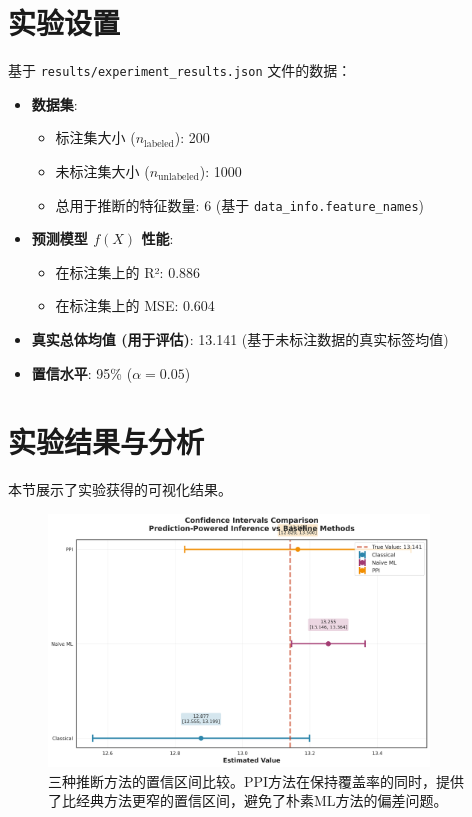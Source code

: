 \documentclass[12pt,a4paper]{article}
\begin{document}
\section{实验设置}
\indent 基于 \texttt{results/experiment\_results.json} 文件的数据：
\begin{itemize}
    \item \textbf{数据集}:
    \begin{itemize}
        \item 标注集大小 ($n_{\text{labeled}}$): 200
        \item 未标注集大小 ($n_{\text{unlabeled}}$): 1000
        \item 总用于推断的特征数量: 6 (基于 \texttt{data\_info.feature\_names})
    \end{itemize}
    \item \textbf{预测模型 $f(X)$ 性能}:
    \begin{itemize}
        \item 在标注集上的 R²: 0.886
        \item 在标注集上的 MSE: 0.604
    \end{itemize}
    \item \textbf{真实总体均值 (用于评估)}: 13.141 (基于未标注数据的真实标签均值)
    \item \textbf{置信水平}: 95\% ($\alpha = 0.05$)
\end{itemize}

\section{实验结果与分析}
\label{sec:results_analysis}

本节展示了实验获得的可视化结果。

\begin{figure}[H]
    \centering
    \includegraphics[width=0.9\textwidth]{confidence_intervals_comparison.png}
    \caption{三种推断方法的置信区间比较。PPI方法在保持覆盖率的同时，提供了比经典方法更窄的置信区间，避免了朴素ML方法的偏差问题。}
    \label{fig:confidence_intervals_comparison}
\end{figure}
\end{document}

